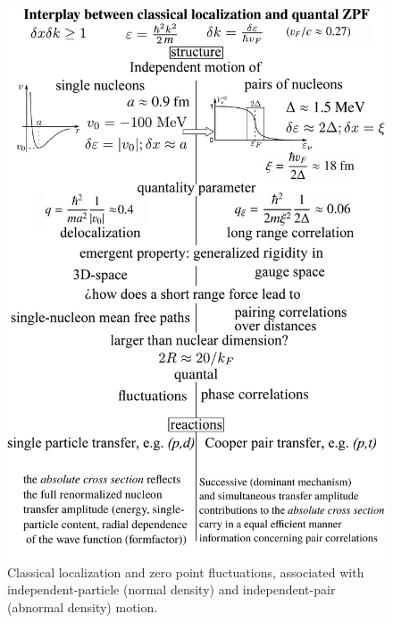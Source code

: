 \begin{figure}
\centerline{\includegraphics*[width=15cm,angle=0]{nutshell/figs/resumevec.pdf}}
\caption{Classical localization and zero point fluctuations, associated with independent-particle (normal density) and independent-pair  (abnormal density) motion.}\label{fig1D2}
\end{figure}







